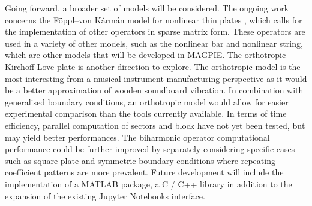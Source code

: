 Going forward, a broader set of models will be considered. The ongoing work concerns the Föppl–von Kármán model for nonlinear thin plates \cite{von_karman_probleme_1910}, which calls for the implementation of other operators in sparse matrix form. These operators are used in a variety of other models, such as the nonlinear bar and nonlinear string, which are other models that will be developed in MAGPIE. The orthotropic Kirchoff-Love plate is another direction to explore. The orthotropic model is the most interesting from a musical instrument manufacturing perspective as it would be a better approximation of wooden soundboard vibration. In combination with  generalised boundary conditions, an orthotropic model would allow for easier experimental comparison than the tools currently available. In terms of time efficiency, parallel computation of sectors and block have not yet been tested, but may yield better performances. The biharmonic operator computational performance could be further improved by separately considering specific cases such as square plate and symmetric boundary conditions where repeating coefficient patterns are more prevalent. Future development will include the implementation of a MATLAB package, a C / C++ library in addition to the expansion of the existing Jupyter Notebooks interface.
\noindent
